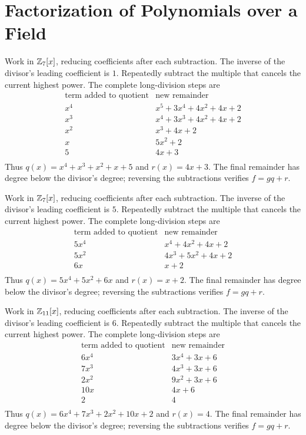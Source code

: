 \section{Factorization of Polynomials over a Field}

Work in $\mathbb{Z}_{7}[x]$, reducing coefficients after each subtraction. The inverse of the divisor's leading coefficient is $1$. Repeatedly subtract the multiple that cancels the current highest power. The complete long-division steps are
\[
\begin{array}{c|l}
\text{term added to quotient}&\text{new remainder}\\\hline
x^4&x^5+3x^4+4x^2+4x+2\\
x^3&x^4+3x^3+4x^2+4x+2\\
x^2&x^3+4x+2\\
x&5x^2+2\\
5&4x+3\\
\end{array}
\]
Thus $\boxed{q(x)=x^4+x^3+x^2+x+5}$ and $\boxed{r(x)=4x+3}$. The final remainder has degree below the divisor's degree; reversing the subtractions verifies $f=gq+r$.

Work in $\mathbb{Z}_{7}[x]$, reducing coefficients after each subtraction. The inverse of the divisor's leading coefficient is $5$. Repeatedly subtract the multiple that cancels the current highest power. The complete long-division steps are
\[
\begin{array}{c|l}
\text{term added to quotient}&\text{new remainder}\\\hline
5x^4&x^4+4x^2+4x+2\\
5x^2&4x^3+5x^2+4x+2\\
6x&x+2\\
\end{array}
\]
Thus $\boxed{q(x)=5x^4+5x^2+6x}$ and $\boxed{r(x)=x+2}$. The final remainder has degree below the divisor's degree; reversing the subtractions verifies $f=gq+r$.

Work in $\mathbb{Z}_{11}[x]$, reducing coefficients after each subtraction. The inverse of the divisor's leading coefficient is $6$. Repeatedly subtract the multiple that cancels the current highest power. The complete long-division steps are
\[
\begin{array}{c|l}
\text{term added to quotient}&\text{new remainder}\\\hline
6x^4&3x^4+3x+6\\
7x^3&4x^3+3x+6\\
2x^2&9x^2+3x+6\\
10x&4x+6\\
2&4\\
\end{array}
\]
Thus $\boxed{q(x)=6x^4+7x^3+2x^2+10x+2}$ and $\boxed{r(x)=4}$. The final remainder has degree below the divisor's degree; reversing the subtractions verifies $f=gq+r$.


